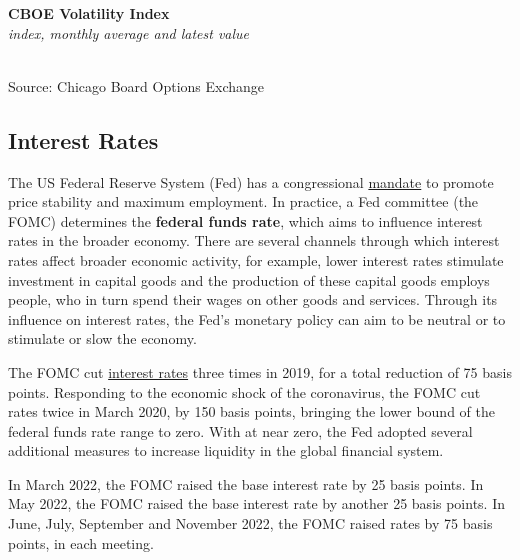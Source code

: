 \documentclass{report}
\makeatletter
\newcommand{\tbllink}[1]{\href{https://raw.githubusercontent.com/bdecon/US-chartbook/master/chartbook/data/#1}{\faTable}}
\newcommand*\short[1]{\expandafter\@gobbletwo\number\numexpr#1\relax}
\newcommand{\dateaxisticks}{
		date coordinates in=x, axis line style={draw=none},
		xmax={2023-02-15},
		max space between ticks=40,	    
		xtick={{1990-01-01}, {1992-01-01}, {1994-01-01}, 
			{1996-01-01}, {1998-01-01}, {2000-01-01}, 
			{2002-01-01}, {2004-01-01}, {2006-01-01},
			{2008-01-01}, {2010-01-01}, {2012-01-01}, {2014-01-01},
		    {2016-01-01}, {2018-01-01}, {2020-01-01}, {2022-01-01}, 
		    {2024-01-01}, {2026-01-01}},
		minor xtick={{1989-01-01}, {1991-01-01}, {1993-01-01},
			{1995-01-01}, {1997-01-01}, {1999-01-01}, 
			{2001-01-01}, {2003-01-01}, {2005-01-01}, {2007-01-01},
		    {2009-01-01}, {2011-01-01}, {2013-01-01}, {2015-01-01},
		    {2017-01-01}, {2019-01-01}, {2021-01-01}, {2023-01-01}, 
		    {2025-01-01}, {2027-01-01}},
		enlarge y limits={0.06}, enlarge x limits={0.01},
		}
\newcommand{\bbar}[2]{extra #1 ticks = {{#2}}, extra #1 tick labels = ,
		extra #1 tick style = {grid=major, grid style={thick, black!25}},}
\newcommand{\stdline}[4]{\addplot[very thick, no markers, color=#1] 
		table [x=#2, y=#3, col sep=comma] {#4};	}
\newcommand{\rbars}{
		\fill[color=black!10] (axis cs:{1990-07-01},\pgfkeysvalueof{/pgfplots/ymin}) rectangle 
			(axis cs:{1991-03-01}, \pgfkeysvalueof{/pgfplots/ymax});
		\fill[color=black!10] (axis cs:{2007-12-01},\pgfkeysvalueof{/pgfplots/ymin}) rectangle 
			(axis cs:{2009-07-01}, \pgfkeysvalueof{/pgfplots/ymax});
		\fill[color=black!10] (axis cs:{2001-03-01},\pgfkeysvalueof{/pgfplots/ymin}) rectangle 
			(axis cs:{2001-11-01}, \pgfkeysvalueof{/pgfplots/ymax});
		\fill[color=black!10] (axis cs:{2020-02-01},\pgfkeysvalueof{/pgfplots/ymin}) rectangle 
			(axis cs:{2020-05-01}, \pgfkeysvalueof{/pgfplots/ymax});}
\makeatother
\begin{document}
{\begin{minipage}{0.76\textwidth}
\normalsize \textbf{CBOE Volatility Index}\\
\footnotesize{\textit{index, monthly average and latest value}}\\
\hspace*{-2mm} \\
\footnotesize{Source: Chicago Board Options Exchange} \hfill \tbllink{vix.csv}
\end{minipage}
\newpage
\begin{minipage}{0.76\textwidth}
\subsection*{Interest Rates}
\hypertarget{capint}{}
\small The US Federal Reserve System (Fed) has a congressional \href{https://www.federalreserve.gov/faqs/money_12848.htm}{mandate} to promote price stability and maximum employment. In practice, a Fed committee (the FOMC) determines the \textbf{federal funds rate}, which aims to influence interest rates in the broader economy. There are several channels through which interest rates affect broader economic activity, for example, lower interest rates stimulate investment in capital goods and the production of these capital goods employs people, who in turn spend their wages on other goods and services. Through its influence on interest rates, the Fed's monetary policy can aim to be neutral or to stimulate or slow the economy.

The FOMC cut \href{https://www.federalreserve.gov/releases/h15/}{interest rates} three times in 2019, for a total reduction of 75 basis points. Responding to the economic shock of the coronavirus, the FOMC cut rates twice in March 2020, by 150 basis points, bringing the lower bound of the federal funds rate range to zero. With at near zero, the Fed adopted several additional measures to increase liquidity in the global financial system.

In March 2022, the FOMC raised the base interest rate by 25 basis points. In May 2022, the FOMC raised the base interest rate by another 25 basis points. In June, July, September and November 2022, the FOMC raised rates by 75 basis points, in each meeting. 
\vspace{2mm}


\end{minipage}}
\end{document}
